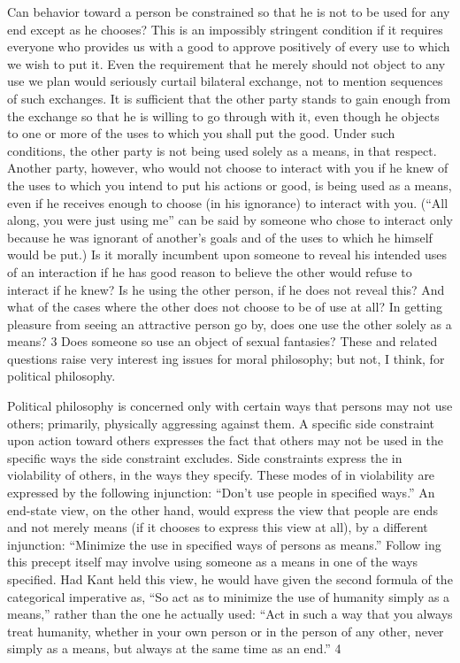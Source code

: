 \documentclass[11pt,openany]{book}
\begin{document}
Can behavior toward a person be constrained so that he is not to be used for any end except as he chooses? This is an impossibly stringent condition if it requires everyone who provides us with a good to approve positively of every use to which we wish to put it. Even the requirement that he merely should not object to any use we plan would seriously curtail bilateral exchange, not to mention sequences of such exchanges. It is sufficient that the other party stands to gain enough from the exchange so that he is willing to go through with it, even though he objects to one or more of the uses to which you shall put the good. Under such conditions, the other party is not being used solely as a means, in that respect. Another party, however, who would not choose to interact with you if he knew of the uses to which you intend to put his actions or good, is being used as a means, even if he receives enough to choose (in his ignorance) to interact with you. (``All along, you were just using me'' can be said by someone who chose to interact only because he was ignorant of another's goals and of the uses to which he himself would be put.) Is it morally incumbent upon someone to reveal his intended uses of an interaction if he has good reason to believe the other would refuse to interact if he knew? Is he using the other person, if he does not reveal this? And what of the cases where the other does not choose to be of use at all? In getting pleasure from seeing an attractive person go by, does one use the other solely as a means? 3 Does someone so use an object of sexual fantasies? These and related questions raise very interest ing issues for moral philosophy; but not, I think, for political philosophy. 

Political philosophy is concerned only with certain ways that persons may not use others; primarily, physically aggressing against them. A specific side constraint upon action toward others expresses the fact that others may not be used in the specific ways the side constraint excludes. Side constraints express the in violability of others, in the ways they specify. These modes of in violability are expressed by the following injunction: ``Don't use people in specified ways.'' An end-state view, on the other hand, would express the view that people are ends and not merely means (if it chooses to express this view at all), by a different injunction: ``Minimize the use in specified ways of persons as means.'' Follow ing this precept itself may involve using someone as a means in one of the ways specified. Had Kant held this view, he would have given the second formula of the categorical imperative as, ``So act as to minimize the use of humanity simply as a means,'' rather than the one he actually used: ``Act in such a way that you always treat humanity, whether in your own person or in the person of any other, never simply as a means, but always at the same time as an end.'' 4 
\end{document}
